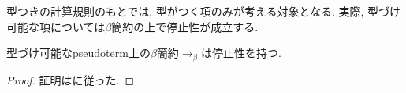 \documentclass{ltjsarticle}
\begin{document}
\begin{defn}
{}
\end{defn}

型つきの計算規則のもとでは, 型がつく項のみが考える対象となる. 実際, 型づけ可能な項については$\beta$簡約の上で停止性が成立する.

\begin{thm}
 型づけ可能なpseudoterm上の$\beta$簡約$\rightarrow_{\beta}$は停止性を持つ.
\end{thm}
\begin{proof}
 証明は\cite{geuvers1994short}に従った.
\end{proof}



\end{document}
